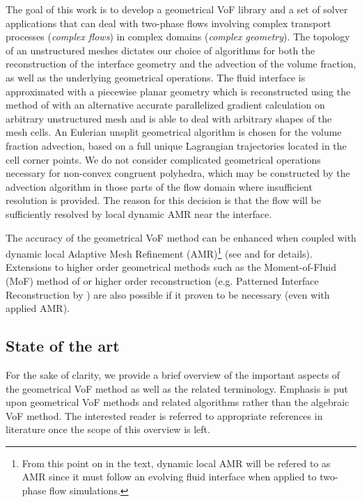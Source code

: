 The goal of this work is to develop a geometrical VoF library and a set of
solver applications that can deal with two-phase flows involving complex
transport processes (\emph{complex flows}) in complex domains (\emph{complex
geometry}). The topology of an unstructured meshes dictates our choice of 
algorithms for both the reconstruction of the interface geometry and the advection 
of the volume fraction, as well as the underlying geometrical operations. The fluid
interface is approximated with a piecewise planar geometry which is
reconstructed using the method of \citet{ParkerYoungsGradient} with an
alternative accurate parallelized gradient calculation on arbitrary
unstructured mesh and is able to deal with arbitrary shapes of the mesh cells.
An Eulerian unsplit geometrical algorithm is chosen for the volume fraction
advection, based on a full unique Lagrangian trajectories located in the cell
corner points. We do not consider complicated geometrical operations necessary
for non-convex congruent polyhedra, which may be constructed by the advection
algorithm in those parts of the flow domain where insufficient resolution is
provided. The reason for this decision is that the flow will
be sufficiently resolved by local dynamic AMR near the interface. 
 
The accuracy of the geometrical VoF method can be enhanced
when coupled with dynamic local Adaptive Mesh Refinement (AMR)\footnote{From
this point on in the text, dynamic local AMR will be refered to as AMR since it
must follow an evolving fluid interface when applied to two-phase flow
simulations.} (see \citet{KotheUnstructured1996} and \citet{Cerne2002} for
details). Extensions to higher order geometrical methods such as the Moment-of-Fluid 
(MoF) method of \citet{AhnShashkov2009} or higher order reconstruction
(e.g.  Patterned Interface Reconstruction by \citet{MossoPIR2009}) are also
possible if it proven to be necessary (even with applied AMR). 


\subsection{State of the art}

For the sake of clarity, we provide a brief overview of the important aspects
of the geometrical VoF method as well as the related terminology. Emphasis is
put upon geometrical VoF methods and related algorithms rather than the algebraic
VoF method. The interested reader is referred to appropriate references in 
literature once the scope of this overview is left. 

